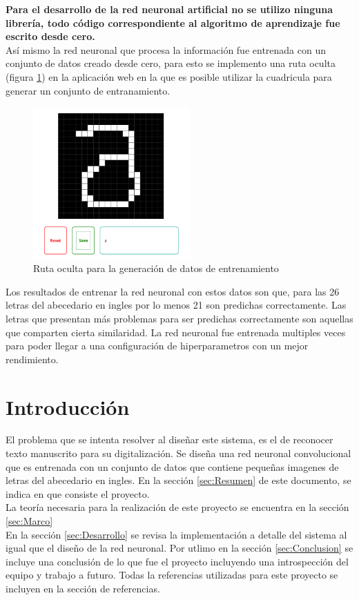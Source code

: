 \documentclass{article}
\begin{document}
\textbf{Para el desarrollo de la red neuronal artificial no se utilizo ninguna librería, todo código correspondiente al algoritmo de aprendizaje fue escrito desde cero.} \\
Así mismo la red neuronal que procesa la información fue entrenada con un conjunto de datos creado desde cero, para esto se implemento una ruta oculta (figura \ref{trainer}) en la aplicación web en la que es posible utilizar la cuadricula para generar 
un conjunto de entranamiento.
\begin{figure}[H]
    \centering
    \includegraphics[width=60mm]{trainer.png}
    \caption{Ruta oculta para la generación de datos de entrenamiento}
    \label{trainer}
\end{figure}
Los resultados de entrenar la red neuronal con estos datos son que, para las 26 letras del abecedario en ingles por lo menos 21 son predichas correctamente. Las letras que presentan más problemas para ser predichas correctamente son aquellas que 
comparten cierta similaridad. La red neuronal fue entrenada multiples veces para poder llegar a una configuración de hiperparametros con un mejor rendimiento. 

\section{Introducción}\label{sec:Introduccion}
El problema que se intenta resolver al diseñar este sistema, es el de reconocer texto manuscrito para su digitalización. 
Se diseña una red neuronal convolucional que es entrenada con un conjunto de datos que contiene pequeñas imagenes de letras del abecedario en ingles. 
En la sección \ref{sec:Resumen} de este documento, se indica en que consiste el proyecto.  \\
La teoría necesaria para la realización de este proyecto se encuentra en la sección \ref{sec:Marco} \\
En la sección \ref{sec:Desarrollo} se revisa la implementación a detalle del sistema al igual que el diseño de la red neuronal. 
Por utlimo en la sección \ref{sec:Conclusion} se incluye una conclusión de lo que fue el proyecto incluyendo una introspección del equipo y trabajo a futuro. 
Todas la referencias utilizadas para este proyecto se incluyen en la sección de referencias.
\end{document}
